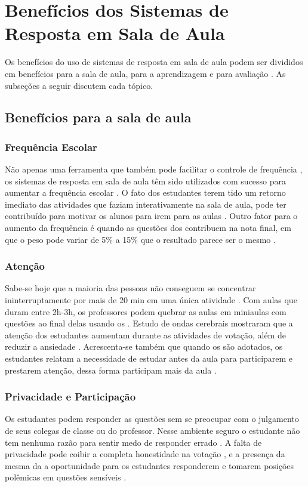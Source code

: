 \section{Benefícios dos Sistemas de Resposta em Sala de Aula}\label{sec:beneficios}
Os benefícios do uso de sistemas de resposta em sala de aula podem ser divididos
em benefícios para a sala de aula, para a aprendizagem e para avaliação \cite{Kay2009}. As
subseções a seguir discutem cada tópico.

\subsection{Benefícios para a sala de aula}

\subsubsection{Frequência Escolar}
Não apenas uma ferramenta que também pode facilitar o controle de frequência
\cite{Strasser2010},
os sistemas de resposta em sala de aula têm sido utilizados com sucesso para aumentar
a frequência escolar \cite{Fotaris2016, Velasco2013, Puente2012, Mayer2009, Caldwell2007}. O fato dos
estudantes terem tido um retorno imediato das atividades que faziam interativamente
na sala de aula, pode ter contribuído para motivar os alunos para irem para as aulas \cite{Puente2012}.
Outro fator para o aumento da frequência é quando as questões dos {\clickers} contribuem na nota final,
em que o peso pode variar de 5\% a 15\% que o resultado parece ser o mesmo \cite{Caldwell2007}.

\subsubsection{Atenção}\label{subsubsection:attention}
Sabe-se hoje que a maioria das pessoas não conseguem se concentrar ininterruptamente
por mais de 20 min em uma única atividade \cite{Caldwell2007, DInverno2003}. Com aulas que
duram entre 2h-3h, os professores podem quebrar as aulas em miniaulas
com questões ao final delas usando os {\clickers} \cite{Hunsu2016}. Estudo de
ondas cerebrais mostraram que a atenção dos estudantes aumentam durante as
atividades de votação, além de reduzir a ansiedade \cite{Sun2014}. Acrescenta-se
também que quando os {\clickers} são adotados, os estudantes relatam a necessidade
de estudar antes da aula para participarem e prestarem atenção, dessa forma participam mais da aula \cite{Terrion2012}.

\subsubsection{Privacidade e Participação}\label{subsubsection:privacy}
Os estudantes podem responder as questões sem se preocupar com o julgamento
de seus colegas de classe ou do professor. Nesse ambiente seguro o estudante
não tem nenhuma razão para sentir medo de responder errado \cite{Schmidt2011}.
 A falta de privacidade pode coibir
a completa honestidade na votação \cite{Caldwell2007}, e a presença da mesma da a oportunidade
para os estudantes responderem e tomarem posições polêmicas em questões sensíveis \cite{Rana2016}.

